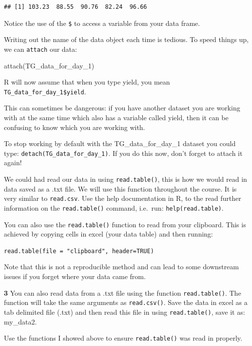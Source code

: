 \documentclass[
]{book}
\makeatletter
\newenvironment{Shaded}{\begin{snugshade}}{\end{snugshade}}
\newcommand{\FunctionTok}[1]{\textcolor[rgb]{0.00,0.00,0.00}{#1}}
\newcommand{\NormalTok}[1]{#1}
\newenvironment{kframe}{%
\medskip{}
\setlength{\fboxsep}{.8em}
 \def\at@end@of@kframe{}%
 \ifinner\ifhmode%
  \def\at@end@of@kframe{\end{minipage}}%
  \begin{minipage}{\columnwidth}%
 \fi\fi%
 \def\FrameCommand##1{\hskip\@totalleftmargin \hskip-\fboxsep
 \colorbox{shadecolor}{##1}\hskip-\fboxsep
     \hskip-\linewidth \hskip-\@totalleftmargin \hskip\columnwidth}%
 \MakeFramed {\advance\hsize-\width
   \@totalleftmargin\z@ \linewidth\hsize
   \@setminipage}}%
 {\par\unskip\endMakeFramed%
 \at@end@of@kframe}
\newenvironment{rmdblock}[1]
  {
  \begin{itemize}
  \renewcommand{\labelitemi}{
    \raisebox{-.7\height}[0pt][0pt]{
      {\setkeys{Gin}{width=3em,keepaspectratio}\texttt{[image: images/\#1]}}
    }
  }
  \setlength{\fboxsep}{1em}
  \begin{kframe}
  \item
  }
  {
  \end{kframe}
  \end{itemize}
  }
\newenvironment{rmdquiz}
  {\begin{rmdblock}{quiz}}
  {\end{rmdblock}}
\newenvironment{rmdwarning}
  {\begin{rmdblock}{warning}}
  {\end{rmdblock}}
\makeatother
\begin{document}
\begin{verbatim}
## [1] 103.23  88.55  90.76  82.24  96.66
\end{verbatim}

Notice the use of the \texttt{\$} to access a variable from your data frame.

Writing out the name of the data object each time is tedious. To speed things up, we can \texttt{attach} our data:

\begin{Shaded}
\begin{Highlighting}[]
\FunctionTok{attach}\NormalTok{(TG\_data\_for\_day\_1)}
\end{Highlighting}
\end{Shaded}

R will now assume that when you type yield, you mean \texttt{TG\_data\_for\_day\_1\$yield}.

\begin{rmdwarning}
This can sometimes be dangerous: if you have another dataset you are working with at the same time which also has a variable called yield, then it can be confusing to know which you are working with.
\end{rmdwarning}

To stop working by default with the TG\_data\_for\_day\_1 dataset you could type: \texttt{detach(TG\_data\_for\_day\_1)}. If you do this now, don't forget to attach it again!

We could had read our data in using \texttt{read.table()}, this is how we would read in data saved as a .txt file. We will use this function throughout the course. It is very similar to \texttt{read.csv}. Use the help documentation in R, to the read further information on the \texttt{read.table()} command, i.e.~run: \texttt{help(read.table)}.

You can also use the \texttt{read.table()} function to read from your clipboard. This is achieved by copying cells in excel (your data table) and then running:

\texttt{read.table(file\ =\ "clipboard",\ header=TRUE)}

Note that this is not a reproducible method and can lead to some downstream issues if you forget where your data came from.

\begin{rmdquiz}
\textbf{3} You can also read data from a .txt file using the function \texttt{read.table()}. The function will take the same arguments as \texttt{read.csv()}. Save the data in excel as a tab delimited file (.txt) and then read this file in using \texttt{read.table()}, save it as: my\_data2.

Use the functions I showed above to ensure \texttt{read.table()} was read in properly.
\end{rmdquiz}
\end{document}
